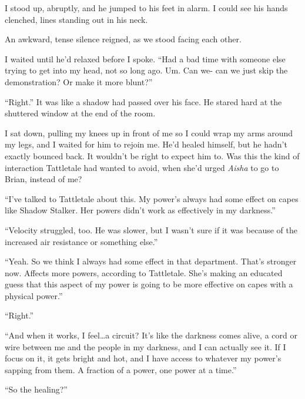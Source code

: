 I stood up, abruptly, and he jumped to his feet in alarm.  I could see his hands clenched, lines standing out in his neck.



An awkward, tense silence reigned, as we stood facing each other.



I waited until he'd relaxed before I spoke.  ``Had a bad time with someone else trying to get into my head, not so long ago.  Um.  Can we- can we just skip the demonstration?  Or make it more blunt?''



``Right.''  It was like a shadow had passed over his face.  He stared hard at the shuttered window at the end of the room.



I sat down,  pulling my knees up in front of me so I could wrap my arms around my legs, and I waited for him to rejoin me.  He'd healed himself, but he hadn't exactly bounced back.  It wouldn't be right to expect him to.  Was this the kind of interaction Tattletale had wanted to avoid, when she'd urged \emph{Aisha} to go to Brian, instead of me?



``I've talked to Tattletale about this.  My power's always had some effect on capes like Shadow Stalker.  Her powers didn't work as effectively in my darkness.''



``Velocity struggled, too.  He was slower, but I wasn't sure if it was because of the increased air resistance or something else.''



``Yeah.  So we think I always had some effect in that department.  That's stronger now.  Affects more powers, according to Tattletale.  She's making an educated guess that this aspect of my power is going to be more effective on capes with a physical power.''



``Right.''



``And when it works, I feel\ldots a circuit?  It's like the darkness comes alive, a cord or wire between me and the people in my darkness, and I can actually see it.  If I focus on it, it gets bright and hot, and I have access to whatever my power's sapping from them.  A fraction of a power, one power at a time.''



``So the healing?''



